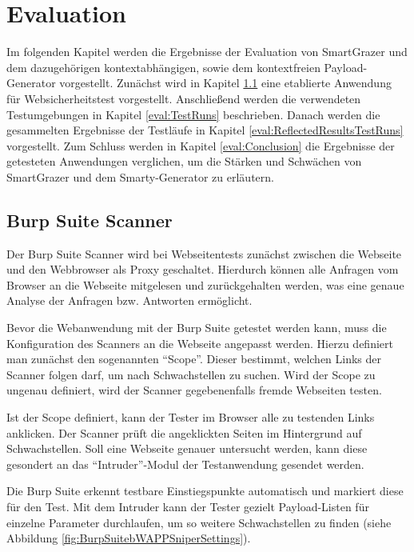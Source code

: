 \chapter{Evaluation}\label{Evaluierung}

Im folgenden Kapitel werden die Ergebnisse der Evaluation von SmartGrazer und dem dazugehörigen kontextabhängigen, sowie dem kontextfreien Payload-Generator vorgestellt. Zunächst wird in Kapitel \ref{eval:BurpSuiteScanner} eine etablierte Anwendung für Websicherheitstest vorgestellt. Anschließend werden die verwendeten Testumgebungen in Kapitel \ref{eval:TestRuns} beschrieben. Danach werden die gesammelten Ergebnisse der Testläufe in Kapitel \ref{eval:ReflectedResultsTestRuns} vorgestellt. Zum Schluss werden in Kapitel \ref{eval:Conclusion} die Ergebnisse der getesteten Anwendungen verglichen, um die Stärken und Schwächen von SmartGrazer und dem Smarty-Generator zu erläutern.

\section{Burp Suite Scanner}\label{eval:BurpSuiteScanner}

Der Burp Suite Scanner wird bei Webseitentests zunächst zwischen die Webseite und den Webbrowser als Proxy geschaltet. Hierdurch können alle Anfragen vom Browser an die Webseite mitgelesen und zurückgehalten werden, was eine genaue Analyse der Anfragen bzw. Antworten ermöglicht.

Bevor die Webanwendung mit der Burp Suite getestet werden kann, muss die Konfiguration des Scanners an die Webseite angepasst werden. Hierzu definiert man zunächst den sogenannten ``Scope''. Dieser bestimmt, welchen Links der Scanner folgen darf, um nach Schwachstellen zu suchen. Wird der Scope zu ungenau definiert, wird der Scanner gegebenenfalls fremde Webseiten testen.

Ist der Scope definiert, kann der Tester im Browser alle zu testenden Links anklicken. Der Scanner prüft die angeklickten Seiten im Hintergrund auf Schwachstellen. Soll eine Webseite genauer untersucht werden, kann diese gesondert an das ``Intruder''-Modul der Testanwendung gesendet werden.

Die Burp Suite erkennt testbare Einstiegspunkte automatisch und markiert diese für den Test. Mit dem Intruder kann der Tester gezielt Payload-Listen für einzelne Parameter durchlaufen, um so weitere Schwachstellen zu finden (siehe Abbildung \ref{fig:BurpSuitebWAPPSniperSettings}).

